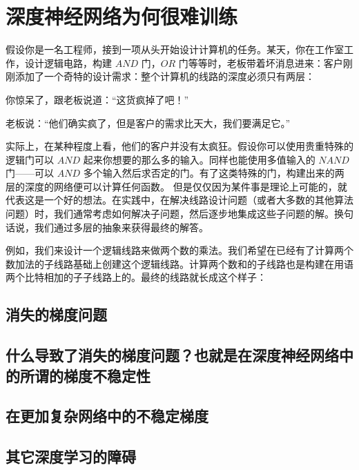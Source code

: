 
\chapter{深度神经网络为何很难训练}
\label{ch:WhyHardToTrain}

假设你是一名工程师，接到一项从头开始设计计算机的任务。某天，你在工作室工作，设计逻辑电路，构建 $AND$ 门，$OR$ 门等等时，老板带着坏消息进来：客户刚刚添加了一个奇特的设计需求：整个计算机的线路的深度必须只有两层： 

你惊呆了，跟老板说道：“这货疯掉了吧！” 
 
老板说：“他们确实疯了，但是客户的需求比天大，我们要满足它。” 
 
实际上，在某种程度上看，他们的客户并没有太疯狂。假设你可以使用贵重特殊的逻辑门可以 $AND$ 起来你想要的那么多的输入。同样也能使用多值输入的 $NAND$ 门——可以 $AND$ 多个输入然后求否定的门。有了这类特殊的门，构建出来的两层的深度的网络便可以计算任何函数。 
但是仅仅因为某件事是理论上可能的，就代表这是一个好的想法。在实践中，在解决线路设计问题（或者大多数的其他算法问题）时，我们通常考虑如何解决子问题，然后逐步地集成这些子问题的解。换句话说，我们通过多层的抽象来获得最终的解答。 

例如，我们来设计一个逻辑线路来做两个数的乘法。我们希望在已经有了计算两个数加法的子线路基础上创建这个逻辑线路。计算两个数和的子线路也是构建在用语两个比特相加的子子线路上的。最终的线路就长成这个样子： 

\section{消失的梯度问题}
\label{sec:the_vanishing_gradient_problem}

\section{什么导致了消失的梯度问题？也就是在深度神经网络中的所谓的梯度不稳定性}

\section{在更加复杂网络中的不稳定梯度}

\section{其它深度学习的障碍}